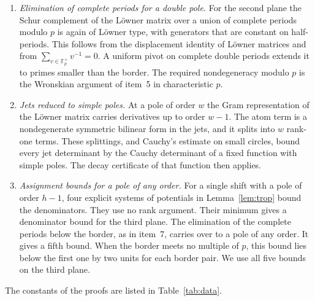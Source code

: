 \documentclass[11pt]{amsart}
\theoremstyle{definition}
\theoremstyle{remark}
\numberwithin{equation}{section}
\newcommand{\F}{\mathbb F}
\begin{document}
\begin{enumerate}[leftmargin=*]
 residues at its poles. For special weights this level returns to an earlier value, and whole blocks of entries become
 $p$-integral. A row operation inside each residue class modulo $p$, by a $p$-integral multiple of a common row,
 gives some further rows the level of the return. This turns the rank of the reduction modulo $p$ into an assignment
 bound, and it gives the points of Theorem~\ref{thm:points1}(iii)--(v).
\item \emph{Elimination of complete periods for a double pole.} For the second plane the Schur complement of the
 L\"owner matrix over a union of complete periods modulo $p$ is again of L\"owner type, with generators that are
 constant on half-periods. This follows from the displacement identity of L\"owner matrices and from
 $\sum_{v\in\F_p^\times}v^{-1}=0$. A uniform pivot on complete double periods extends it to primes smaller than the border.
 The required nondegeneracy modulo $p$ is the Wronskian argument of item~5 in characteristic $p$.
\item \emph{Jets reduced to simple poles.} At a pole of order $w$ the Gram representation of the L\"owner matrix
 carries derivatives up to order $w-1$. The atom term is a nondegenerate symmetric bilinear form in the jets, and it
 splits into $w$ rank-one terms. These splittings, and Cauchy's estimate on small circles, bound every jet determinant
 by the Cauchy determinant of a fixed function with simple poles. The decay certificate of that function then applies.
\item \emph{Assignment bounds for a pole of any order.} For a single shift with a pole of order $h-1$, four explicit
 systems of potentials in Lemma~\ref{lem:trop} bound the denominators. They use no rank argument. Their minimum
 gives a denominator bound for the third plane. The elimination of the complete periods below the border, as in
 item~7, carries over to a pole of any order. It gives a fifth bound. When the border meets no multiple of $p$, this
 bound lies below the first one by two units for each border pair. We use all five bounds on the third plane.
\end{enumerate}
The constants of the proofs are listed in Table~\ref{tab:data}.
\end{document}

